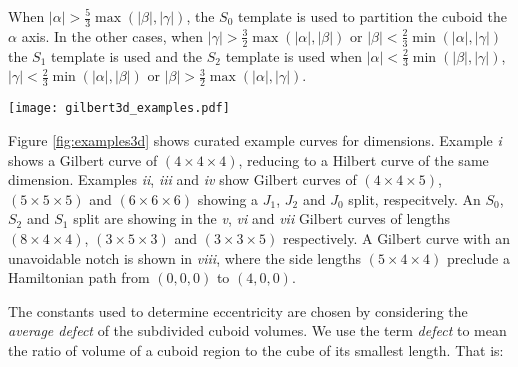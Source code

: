 When $|\alpha| > \frac{5}{3} \max(|\beta|, |\gamma|)$, the $S_0$ template is used to partition the cuboid the $\alpha$ axis.
In the other cases, when $|\gamma| > \frac{3}{2} \max(|\alpha|, |\beta|)$ or $|\beta| < \frac{2}{3} \min(|\alpha|, |\gamma|)$ the $S_1$
template is used and the $S_2$ template is used when
$|\alpha| < \frac{2}{3} \min(|\beta|, |\gamma|)$,
$|\gamma| < \frac{2}{3} \min(|\alpha|, |\beta|)$ or
$|\beta| > \frac{3}{2} \max(|\alpha|, |\gamma|)$.

\begin{figure*}[ht]
  \centering
  \texttt{[image: gilbert3d\_examples.pdf]}
  \caption{ Examples
  of 3D Gilbert curves highlighting different aspects of the algorithm.
  i) $(4 \times 4 \times 4)$, equivalent to the Hilbert curve of the same side lengths.
  ii) $(4 \times 4 \times 5)$ show a $J_1$ split subdivision scheme.
  iii) $(5 \times 5 \times 5)$, shows a $J_2$ split subdivision scheme.
  iv) $(6 \times 6 \times 6)$, shows a $J_0$ subdivision scheme.
  v) $(8 \times 4 \times 4)$, shows an $S_0$ subdivision scheme, splitting on the $\alpha$ dimension.
  vi) $(3 \times 5 \times 3)$, shows an $S_2$ subdivision scheme.
  vii) $(3 \times 3 \times 5)$, shows an $S_1$ subdivision scheme.
  viii) $(5 \times 4 \times 4)$, shows an example of a configuration where a diagonal move (\textit{notch}) is formed
  as there's no Hamiltonian path possible for the given endpoints.
  }
  \label{fig:examples3d}
\end{figure*}


Figure \ref{fig:examples3d} shows curated example curves for dimensions.
Example \textit{i} shows a Gilbert curve of $(4 \times 4 \times 4)$, reducing to a Hilbert curve of the same dimension.
Examples \textit{ii}, \textit{iii} and \textit{iv} show Gilbert curves of $(4 \times 4 \times 5)$, $(5 \times 5 \times 5)$
and $(6 \times 6 \times 6)$ showing a $J_1$, $J_2$ and $J_0$ split, respecitvely.
An $S_0$, $S_2$ and $S_1$ split are showing in the \textit{v}, \textit{vi} and \textit{vii} Gilbert curves of
lengths $(8 \times 4 \times 4)$, $(3 \times 5 \times 3)$ and $(3 \times 3 \times 5)$ respectively.
A Gilbert curve with an unavoidable notch is 
shown in \textit{viii}, where the side lengths $(5 \times 4 \times 4)$ preclude a Hamiltonian path from $(0,0,0)$ to $(4,0,0)$.


The constants used to determine eccentricity are chosen by considering the \textit{average defect} of the subdivided cuboid volumes.
We use the term \textit{defect} to mean the ratio of volume of a cuboid region to the cube of its smallest length.
That is:

